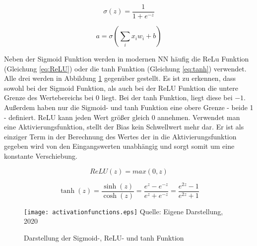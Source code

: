 \begin{equation} \label{eq:sigmoid}
    \sigma (z) =  \frac{1}{1+e^{-z}}
\end{equation}

\begin{equation} \label{eq:outputNeuron}
    a = \sigma (\sum_{i}{x_i w_i + b})
\end{equation}

Neben der Sigmoid Funktion werden in modernen \ac{NN} häufig die ReLu Funktion (Gleichung \ref{eq:ReLU}) oder die tanh Funktion (Gleichung \ref{eq:tanh}) verwendet. Alle drei werden in Abbildung \ref{fig:activationfunctions} gegenüber gestellt. Es ist zu erkennen, dass sowohl bei der Sigmoid Funktion, als auch bei der ReLU Funktion die untere Grenze des Wertebereichs bei $0$ liegt. Bei der tanh Funktion, liegt diese bei $-1$. Außerdem haben nur die Sigmoid- und tanh Funktion eine obere Grenze - beide 1 - definiert. ReLU kann jeden Wert größer gleich $0$ annehmen. Verwendet man eine Aktivierungsfunktion, stellt der Bias kein Schwellwert mehr dar. Er ist als einziger Term in der Berechnung des Wertes der in die Aktivierungsfunktion gegeben wird von den Eingangswerten unabhängig und sorgt somit um eine konstante Verschiebung.

\begin{equation} \label{eq:ReLU}
    ReLU(z) = max(0,z)
\end{equation}

\begin{equation} \label{eq:tanh}
    \tanh(z) = \frac{\sinh(z)}{\cosh(z)} = \frac {e^z - e^{-z}} {e^z + e^{-z}}
  = \frac{e^{2z} - 1} {e^{2z} + 1}
\end{equation}

\begin{figure}[t]
    \centering
    \caption[]{Darstellung der Sigmoid-, ReLU- und tanh Funktion}
	\label{fig:activationfunctions}
    \texttt{[image: activationfunctions.eps]}
    Quelle: Eigene Darstellung, 2020
\end{figure}

